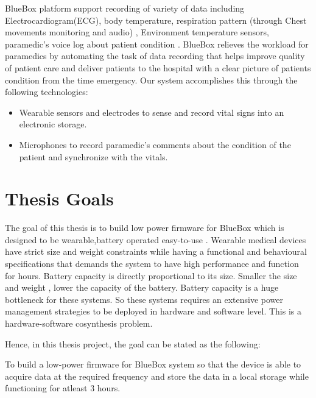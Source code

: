 \hspace{10mm}BlueBox  platform support recording of variety of data including Electrocardiogram(ECG), body temperature, respiration pattern (through Chest movements monitoring and audio) , Environment temperature sensors, paramedic’s voice log about patient condition . BlueBox relieves the workload for paramedics by automating the task of data recording that helps improve quality of patient care and deliver patients to the hospital with a clear picture of patients condition from the time emergency. Our system accomplishes this through the following technologies:

\begin{itemize}
	\item Wearable sensors and electrodes to sense and record vital signs into an electronic storage.

	\item Microphones to record paramedic’s comments about the condition of the patient and synchronize with the vitals.
	
\end{itemize}

\section{Thesis Goals}
\hspace{10mm}The goal of this thesis is to build low power firmware for BlueBox which is designed to be wearable,battery operated easy-to-use . Wearable medical devices have strict size and weight constraints while having a functional and behavioural specifications that demands the system to have high performance and function for hours. Battery capacity is directly proportional to its size. Smaller the size and weight , lower the capacity of the battery\cite{}. Battery capacity is a huge bottleneck for these systems. So these systems requires an extensive power management strategies to be deployed in hardware and software level. This is a hardware-software cosynthesis problem.

Hence, in this thesis project, the goal can be stated as the following:

 \hspace{10mm}To build a low-power firmware for BlueBox system so that the device is able to acquire data at the required frequency and store the data in a local storage while functioning for atleast 3 hours. 
 
